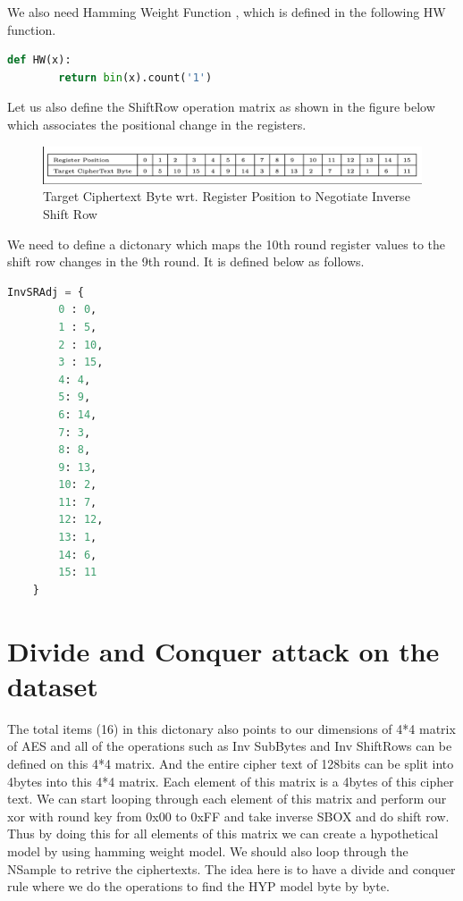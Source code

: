 \documentclass[12pt, letterpaper, oneside]{report}
\begin{document}
We also need Hamming Weight Function , which is defined in the following HW function.\\

\begin{lstlisting}[language=Python, caption=Hamming Weight Function]
    def HW(x):
        return bin(x).count('1')
\end{lstlisting}

Let us also define the ShiftRow operation matrix as shown in the figure below which associates the positional change in the registers.\\

\begin{figure}[H]
    \centering
    \includegraphics[width=1\linewidth]{image.png}
    \caption{Target Ciphertext Byte wrt. Register Position to Negotiate Inverse Shift
    Row}
    \label{fig:enter-label}
\end{figure}

We need to define a dictonary which maps the 10th round register values to the shift row changes in the 9th round. It is defined below as follows.\\



\begin{lstlisting}[language=Python, caption=dict for the inverse SR ]
    InvSRAdj = {
        0 : 0, 
        1 : 5, 
        2 : 10, 
        3 : 15, 
        4: 4, 
        5: 9, 
        6: 14, 
        7: 3, 
        8: 8, 
        9: 13, 
        10: 2, 
        11: 7, 
        12: 12, 
        13: 1, 
        14: 6, 
        15: 11
    }
\end{lstlisting}

\section{Divide and Conquer attack on the dataset}

The total items (16) in this dictonary also points to our dimensions of 4*4 matrix of AES and all of the operations such as Inv SubBytes and Inv ShiftRows can be defined on this 4*4 matrix. And the entire cipher text of 128bits can be split into 4bytes into this 4*4 matrix. Each element of this matrix is a 4bytes of this cipher text. We can start looping through each element of this matrix and perform our xor with round key from 0x00 to 0xFF and take inverse SBOX and do shift row. Thus by doing this for all elements of this matrix we can create a hypothetical model by using hamming weight model. We should also loop through the NSample to retrive the ciphertexts. The idea here is to have a divide and conquer rule where we do the operations to find the HYP model byte by byte.\\
\end{document}
